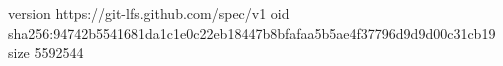 version https://git-lfs.github.com/spec/v1
oid sha256:94742b5541681da1c1e0c22eb18447b8bfafaa5b5ae4f37796d9d9d00c31cb19
size 5592544

